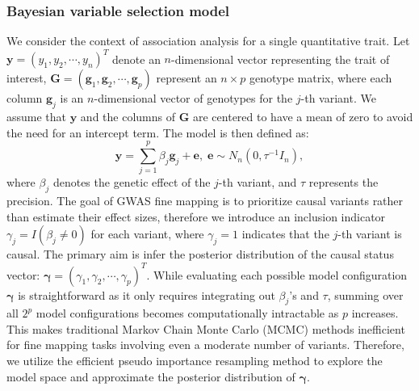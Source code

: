\documentclass[pdflatex,sn-mathphys-num]{sn-jnl}%
\theoremstyle{thmstyleone}%
\theoremstyle{thmstyletwo}%
\theoremstyle{thmstylethree}%
\begin{document}
\subsubsection{Bayesian variable selection model}\label{subsubsec1}
We consider the context of association analysis for a single quantitative trait. Let $\mathbf{y}=\left(y_1,y_2,\cdots,y_n\right)^T$ denote an $n$-dimensional vector representing the trait of interest, $\mathbf{G} = \left(\mathbf{g}_1,\mathbf{g}_2,\cdots,\mathbf{g}_p\right)$ represent an $n \times p$ genotype matrix, where each column $\mathbf{g}_j$ is an $n$-dimensional vector of genotypes for the $j$-th variant. We assume that $\mathbf{y}$ and the columns of $\mathbf{G}$ are centered to have a mean of zero to avoid the need for an intercept term. The model is then defined as:
\begin{equation}
    \mathbf{y} = \sum_{j=1}^{p} \beta_j \mathbf{g}_j  + \mathbf{e}, \; \mathbf{e} \sim N_n\left(0, \tau^{-1}I_n\right),
\end{equation}
where $\beta_j$ denotes the genetic effect of the $j$-th variant, and $\tau$ represents the precision. The goal of GWAS fine mapping is to prioritize causal variants rather than estimate their effect sizes, therefore we introduce an inclusion indicator $\gamma_j = I(\beta_j \neq 0)$ for each variant, where $\gamma_j=1$ indicates that the $j$-th variant is causal. The primary aim is infer the posterior distribution of the causal status vector: $\boldsymbol{\gamma} = \left(\gamma_1,\gamma_2,\cdots,\gamma_p\right)^T$. While evaluating each possible model configuration $\boldsymbol{\gamma}$ is straightforward as it only requires integrating out $\beta_j$'s and $\tau$, summing over all $2^p$ model configurations becomes computationally intractable as $p$ increases. This makes traditional Markov Chain Monte Carlo (MCMC) methods inefficient for fine mapping tasks involving even a moderate number of variants. Therefore, we utilize the efficient pseudo importance resampling method to explore the model space and approximate the posterior distribution of $\boldsymbol{\gamma}$.
\end{document}
